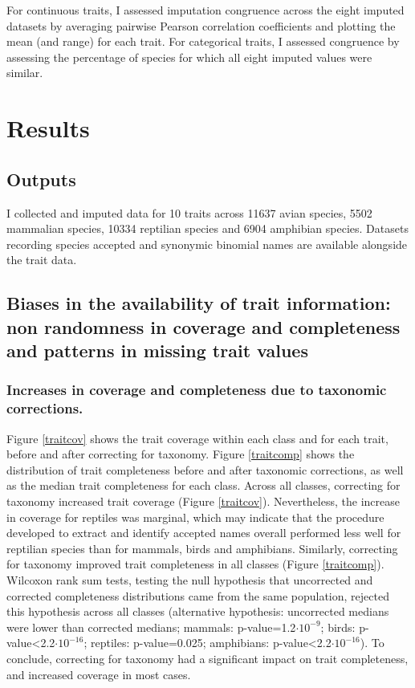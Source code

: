 For continuous traits, I assessed imputation congruence across the eight imputed datasets by averaging pairwise Pearson correlation coefficients and plotting the mean (and range) for each trait. For categorical traits, I assessed congruence by assessing the percentage of species for which all eight imputed values were similar.

\section{Results}

\subsection{Outputs}
I collected and imputed data for 10 traits across 11637 avian species, 5502 mammalian species, 10334 reptilian species and 6904 amphibian species. Datasets recording species accepted and synonymic binomial names are available alongside the trait data. 

\subsection{Biases in the availability of trait information: non randomness in coverage and completeness and patterns in missing trait values}

\subsubsection{Increases in coverage and completeness due to taxonomic corrections.} 
Figure \ref{traitcov} shows the trait coverage within each class and for each trait, before and after correcting for taxonomy. Figure \ref{traitcomp} shows the distribution of trait completeness before and after taxonomic corrections, as well as the median trait completeness for each class.
Across all classes, correcting for taxonomy increased trait coverage (Figure \ref{traitcov}). Nevertheless, the increase in coverage for reptiles was marginal, which may indicate that the procedure developed to extract and identify accepted names overall performed less well for reptilian species than for mammals, birds and amphibians. Similarly, correcting for taxonomy improved trait completeness in all classes (Figure \ref{traitcomp}). Wilcoxon rank sum tests, testing the null hypothesis that uncorrected and corrected completeness distributions came from the same population, rejected this hypothesis across all classes (alternative hypothesis: uncorrected medians were lower than corrected medians; mammals: p-value=1.2$\cdot10^{-9}$; birds: p-value<2.2$\cdot10^{-16}$; reptiles: p-value=0.025; amphibians: p-value<2.2$\cdot10^{-16}$). To conclude, correcting for taxonomy had a significant impact on trait completeness, and increased coverage in most cases. 


